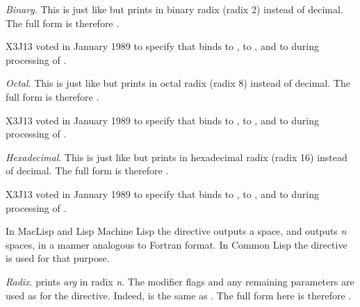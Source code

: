 \begin{flushdesc}
\item[\cd{{\Xtilde}B}]
\emph{Binary}.
This is just like  but prints in binary radix (radix 2)
instead of decimal.  The full form is therefore
.

\begin{new}
X3J13 voted in January 1989
to specify that  binds 
to ,  to , and  to 
during processing of .
\end{new}

\item[\cd{{\Xtilde}O}]
\emph{Octal}.
This is just like  but prints in octal radix (radix 8)
instead of decimal.  The full form is therefore
.

\begin{new}
X3J13 voted in January 1989
to specify that  binds 
to ,  to , and  to 
during processing of .
\end{new}

\item[\cd{{\Xtilde}X}]
\emph{Hexadecimal}.
This is just like  but prints in hexadecimal radix
(radix 16) instead of decimal.  The full form is therefore
.

\begin{new}
X3J13 voted in January 1989
to specify that  binds 
to ,  to , and  to 
during processing of .
\end{new}

\beforenoterule
\begin{incompatibility}
In MacLisp and Lisp Machine Lisp the  directive
outputs a space, and  outputs \emph{n} spaces,
in a manner analogous to Fortran  format.
In Common Lisp the directive  is used for that purpose.
\end{incompatibility}
\afternoterule

\item[\cd{{\Xtilde}R}]
\emph{Radix}.
 prints \emph{arg} in radix \emph{n}.
The modifier flags and any remaining parameters are used as for
the  directive.
Indeed,  is the same as .  The full form here is therefore
.


\end{flushdesc}

